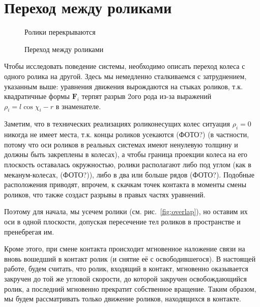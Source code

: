 
\section{Переход между роликами}

\begin{figure}
        \centering
        \caption{Ролики перекрываются}
        \label{fig:overlap}
    \endminipage
        \centering
        \caption{Переход между роликами}
        \label{fig:change}
    \endminipage
\end{figure}

Чтобы исследовать поведение системы, необходимо описать переход колеса с одного ролика на другой. Здесь мы немедленно сталкиваемся с затруднением, указанным выше: уравнения движения вырождаются на стыках роликов, т.к. квадратичные формы $\boldsymbol{F}_i$ терпят разрыв 2ого рода из-за выражений $\rho_i = l\cos\chi_i-r$ в знаменателе.

Заметим, что в технических реализациях роликонесущих колес ситуация $\rho_i = 0$ никогда не имеет места, т.к. концы роликов усекаются (ФОТО?) (в частности, потому что оси роликов в реальных системах имеют ненулевую толщину и должны быть закреплены в колесах), а чтобы граница проекции колеса на его плоскость оставалась окружностью, ролики располагают либо под углом (как в меканум-колесах, (ФОТО?)), либо в два или больше рядов (ФОТО?). Подобные расположения приводят, впрочем, к скачкам точек контакта в моменты смены роликов, что также создаст разрывы в правых частях уравнений.

Поэтому для начала, мы усечем ролики (см. рис.~\ref{fig:overlap}), но оставим их оси в одной плоскости, допуская пересечение тел роликов в пространстве и пренебрегая им.

Кроме этого, при смене контакта происходит мгновенное наложение связи на вновь вошедший в контакт ролик (и снятие её с освободившегося). В настоящей работе, будем считать, что ролик, входящий в контакт, мгновенно оказывается закручен до той же угловой скорости, до которой закручен освобождающийся ролик, а последний мгновенно прекратит собственное вращение. Таким образом, мы будем рассматривать только движение роликов, находящихся в контакте.

